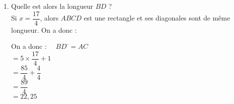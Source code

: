 \documentclass[a4paper,11pt,exos]{nsi}
\begin{document}
\begin{enumerate}
	\item	 \textcolor{UGLiBlue}{Quelle est alors la longueur $BD$ ?}\\[.5em]
	Si $x=\dfrac{17}{4}$, alors $ABCD$ est une rectangle et ses diagonales sont de même longueur. On a donc :
    \begin{tabbing}
        On a donc : $\quad BD$    \=$=AC$\\[.5em]
        \>  $=5\times \dfrac{17}{4}+1$\\[.5em]
        \>  $=\dfrac{85}{4}+\dfrac{4}{4}$\\[.5em]
        \>  $=\dfrac{89}{4}$\\[.5em]
        \>  $=22,25$
    \end{tabbing}
\end{enumerate}
\end{document}
